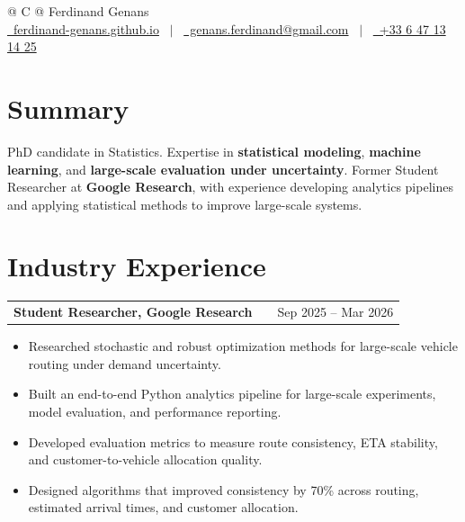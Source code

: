 \documentclass[a4paper,10pt]{article}
\makeatletter
\newenvironment{joblong}[2]
    {
    \begin{tabularx}{\linewidth}{@{}l X r@{}}
    \textbf{#1} & \hfill &  #2 \\[3.75pt]
    \end{tabularx}
    \begin{minipage}[t]{\linewidth}
    \begin{itemize}[nosep,after=\strut, leftmargin=1em, itemsep=3pt,label=--]
    }
    {
    \end{itemize}
    \end{minipage}    
    }
\makeatother
\begin{document}
\pagestyle{empty}


\begin{tabularx}{\linewidth}{@{} C @{}}
    \Huge{Ferdinand Genans} \\[7.5pt]
    \href{https://ferdinand-genans.github.io/}{\raisebox{-0.05\height}\faGlobe \ ferdinand-genans.github.io} \ $|$ \
    \href{mailto:genans.ferdinand@gmail.com}{\raisebox{-0.05\height}\faEnvelope \ genans.ferdinand@gmail.com} \ $|$ \
    \href{tel:+33647131425}{\raisebox{-0.05\height}\faMobile \ +33 6 47 13 14 25}
\end{tabularx}


\section{Summary}
PhD candidate in Statistics. Expertise in \textbf{statistical modeling}, \textbf{machine learning}, and \textbf{large-scale evaluation under uncertainty}. Former Student Researcher at \textbf{Google Research}, with experience developing analytics pipelines and applying statistical methods to improve large-scale systems.

\section{Industry Experience}

\begin{joblong}{Student Researcher, Google Research}{Sep 2025 -- Mar 2026}
    \item Researched stochastic and robust optimization methods for large-scale vehicle routing under demand uncertainty.
    \item Built an end-to-end Python analytics pipeline for large-scale experiments, model evaluation, and performance reporting.
    \item Developed evaluation metrics to measure route consistency, ETA stability, and customer-to-vehicle allocation quality.
    \item Designed algorithms that improved consistency by 70\% across routing, estimated arrival times, and customer allocation.
\end{joblong}
\end{document}
